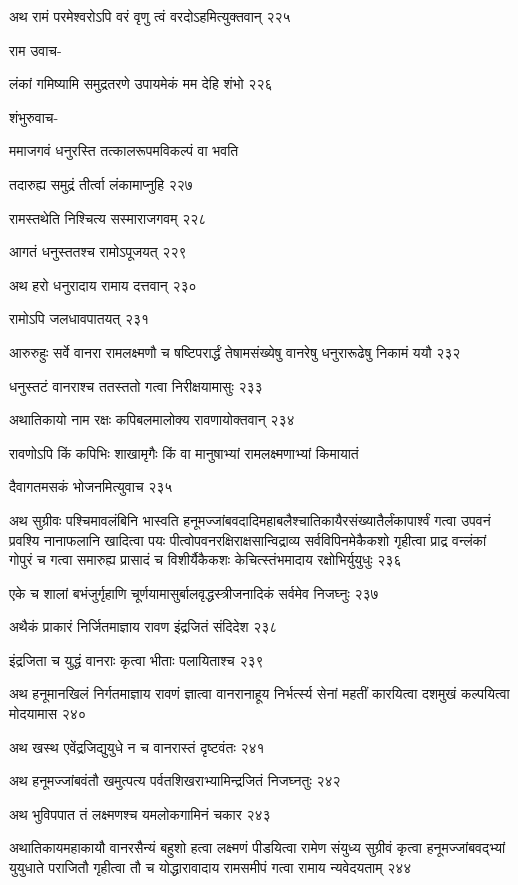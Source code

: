 अथ रामं परमेश्वरोऽपि वरं वृणु त्वं वरदोऽहमित्युक्तवान् २२५

राम उवाच-

लंकां गमिष्यामि समुद्रतरणे उपायमेकं मम देहि शंभो २२६

शंभुरुवाच-

ममाजगवं धनुरस्ति तत्कालरूपमविकल्पं वा भवति

तदारुह्य समुद्रं तीर्त्वा लंकामाप्नुहि २२७

रामस्तथेति निश्चित्य सस्माराजगवम् २२८

आगतं धनुस्ततश्च रामोऽपूजयत् २२९

अथ हरो धनुरादाय रामाय दत्तवान् २३०

रामोऽपि जलधावपातयत् २३१

आरुरुहुः सर्वे वानरा रामलक्ष्मणौ च षष्टिपरार्द्धं तेषामसंख्येषु वानरेषु धनुरारूढेषु निकामं ययौ
 २३२

धनुस्तटं वानराश्च ततस्ततो गत्वा निरीक्षयामासुः २३३

अथातिकायो नाम रक्षः कपिबलमालोक्य रावणायोक्तवान् २३४

रावणोऽपि किं कपिभिः शाखामृगैः किं वा मानुषाभ्यां रामलक्ष्मणाभ्यां किमायातं

दैवागतमसकं भोजनमित्युवाच २३५

अथ सुग्रीवः पश्चिमावलंबिनि भास्वति हनूमज्जांबवदादिमहाबलैश्चातिकायैरसंख्यातैर्लंकापार्श्वं
गत्वा उपवनं प्रवश्यि नानाफलानि खादित्वा पयः पीत्वोपवनरक्षिराक्षसान्विद्राव्य
सर्वविपिनमेकैकशो गृहीत्वा प्राद्र वन्लंकां गोपुरं च गत्वा समारुह्य प्रासादं च विशीर्यैकैकशः
केचित्स्तंभमादाय रक्षोभिर्युयुधुः २३६

एके च शालां बभंजुर्गृहाणि चूर्णयामासुर्बालवृद्धस्त्रीजनादिकं सर्वमेव निजघ्नुः २३७

अथैकं प्राकारं निर्जितमाज्ञाय रावण इंद्रजितं संदिदेश २३८

इंद्रजिता च युद्धं वानराः कृत्वा भीताः पलायिताश्च २३९

अथ हनूमानखिलं निर्गतमाज्ञाय रावणं ज्ञात्वा वानरानाहूय निर्भर्त्स्य सेनां महतीं कारयित्वा
दशमुखं कल्पयित्वा मोदयामास २४०

अथ खस्थ एवेंद्रजिद्युयुधे न च वानरास्तं दृष्टवंतः २४१

अथ हनूमज्जांबवंतौ खमुत्पत्य पर्वतशिखराभ्यामिन्द्रजितं निजघ्नतुः २४२

अथ भुविपपात तं लक्ष्मणश्च यमलोकगामिनं चकार २४३

अथातिकायमहाकायौ वानरसैन्यं बहुशो हत्वा लक्ष्मणं पीडयित्वा रामेण संयुध्य सुग्रीवं कृत्वा
हनूमज्जांबवद्भ्यां युयुधाते पराजितौ गृहीत्वा तौ च योद्धारावादाय रामसमीपं गत्वा रामाय
न्यवेदयताम् २४४

